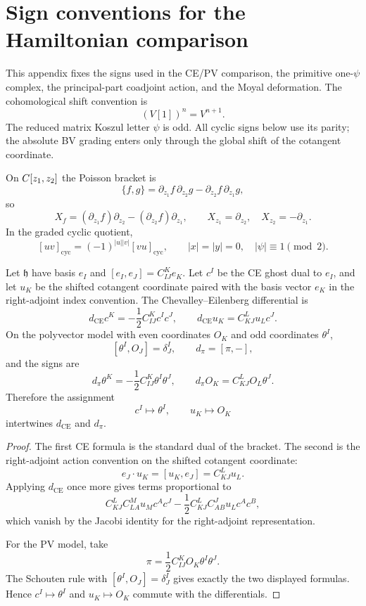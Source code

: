 \section{Sign conventions for the Hamiltonian comparison}
\label{sec:app-sign-conventions}
\label{app:sign-conventions}

This appendix fixes the signs used in the CE/PV comparison, the
primitive one-\(\psi\) complex, the principal-part coadjoint action, and
the Moyal deformation.  The cohomological shift convention is
\[
  (V[1])^n=V^{n+1}.
\]
The reduced matrix Koszul letter \(\psi\) is odd.  All cyclic signs
below use its parity; the absolute BV grading enters only through the
global shift of the cotangent coordinate.

\begin{defn}
\label{def:app-sign-hamiltonian-cyclic}
  On \(C[z_1,z_2]\) the Poisson bracket is
  \[
    \{f,g\}
      =
      \partial_{z_1}f\,\partial_{z_2}g
      -
      \partial_{z_2}f\,\partial_{z_1}g,
  \]
  so
  \[
    X_f=(\partial_{z_1}f)\partial_{z_2}
        -(\partial_{z_2}f)\partial_{z_1},\qquad
    X_{z_1}=\partial_{z_2},\quad X_{z_2}=-\partial_{z_1}.
  \]
	  In the graded cyclic quotient,
	  \[
	    [uv]_{\mathrm{cyc}}=(-1)^{|u||v|}[vu]_{\mathrm{cyc}},
	    \qquad |x|=|y|=0,\quad |\psi|\equiv1\pmod 2.
	  \]
\end{defn}

\begin{lem}[CE/PV signs]
\label{lem:app-sign-ce-pv}
  Let \(\mathfrak h\) have basis \(e_I\) and
  \([e_I,e_J]=C^K_{IJ}e_K\).  Let \(c^I\) be the CE ghost dual to
  \(e_I\), and let \(u_K\) be the shifted cotangent coordinate paired
  with the basis vector \(e_K\) in the right-adjoint index convention.
  The Chevalley--Eilenberg differential is
  \[
    d_{\mathrm{CE}}c^K=-\frac12 C^K_{IJ}c^Ic^J,\qquad
    d_{\mathrm{CE}}u_K=C^L_{KJ}u_Lc^J.
  \]
  On the polyvector model with even coordinates \(O_K\) and odd
  coordinates \(\theta^I\),
  \[
    [\theta^I,O_J]=\delta^I_J,\qquad d_\pi=[\pi,-],
  \]
  and the signs are
  \[
    d_\pi\theta^K=-\frac12 C^K_{IJ}\theta^I\theta^J,\qquad
    d_\pi O_K=C^L_{KJ}O_L\theta^J.
  \]
  Therefore the assignment
  \[
    c^I\longmapsto\theta^I,\qquad u_K\longmapsto O_K
  \]
  intertwines \(d_{\mathrm{CE}}\) and \(d_\pi\).
\end{lem}

\begin{proof}
  The first CE formula is the standard dual of the bracket.  The second
  is the right-adjoint action convention on the shifted cotangent
  coordinate:
  \[
    e_J\cdot u_K=[u_K,e_J]=C^L_{KJ}u_L.
  \]
  Applying \(d_{\mathrm{CE}}\) once more gives terms proportional to
  \[
    C^L_{KJ}C^M_{LA}u_Mc^Ac^J
    -\frac12 C^L_{KJ}C^J_{AB}u_Lc^Ac^B,
  \]
  which vanish by the Jacobi identity for the right-adjoint
  representation.

  For the PV model, take
  \[
    \pi=\frac12 C^K_{IJ}O_K\theta^I\theta^J.
  \]
  The Schouten rule with \([\theta^I,O_J]=\delta^I_J\) gives exactly the
  two displayed formulas.  Hence \(c^I\mapsto\theta^I\) and
  \(u_K\mapsto O_K\) commute with the differentials.
\end{proof}

